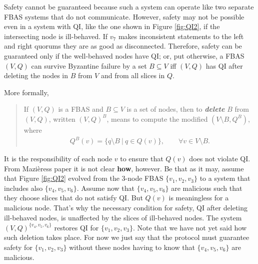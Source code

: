 Safety cannot be guaranteed because such a system can operate like two separate FBAS systems that do not communicate. However, safety may not be possible even in a system with QI, like the one shown in Figure \ref{fig:QI2}, if the intersecting node is ill-behaved. If $v_7$ makes inconsistent statements to the left and right quorums they are as good as disconnected. Therefore, safety can be guaranteed only if the well-behaved nodes have QI; or, put otherwise, a FBAS $(V, Q)$ can survive Byzantine failure by a set $B \subseteq V$ iff $(V, Q)$ has QI after deleting the nodes in $B$ from $V$ and from all slices in $Q$. 

More formally,
\begin{quote}
\vspace{-0.6cm}
\small
\begin{defin}
\label{delete}
If $(V, Q)$ is a FBAS and $B \subseteq V$ is a set of nodes, then to \emph{\textbf{delete}} $B$ from $(V, Q)$, written $(V, Q)^B$, means to compute the modified $(V \setminus B, Q^B)$, where
\begin{align}
Q^B(v) = \{ q \setminus B\ |\ q \in Q(v) \},		\qquad \forall v \in V \setminus B.
\end{align}
\end{defin}
\end{quote}
It is the responsibility of each node $v$ to ensure that $Q(v)$ does not violate QI. From Mazi\`eress paper it is not clear {\bf how}, however. Be that as it may, assume that Figure \ref{fig:QI2} evolved from the 3-node FBAS $\{ v_1, v_2, v_3 \}$ to a system that includes also $\{ v_4, v_5, v_6 \}$. Assume now that $\{ v_4, v_5, v_6 \}$ are malicious such that they choose slices that do not satisfy QI. But $Q(v)$ is meaningless for a malicious node. That's why the necessary condition for safety, QI after deleting ill-behaved nodes, is unaffected by the slices of ill-behaved nodes. The system $(V, Q)^{ \{ v_4, v_5, v_6 \} }$ restores QI for $\{ v_1, v_2, v_3 \}$. Note that we have not yet said how such deletion takes place. For now we just say that the protocol must guarantee safety for $\{ v_1, v_2, v_3 \}$ without these nodes having to know that $\{ v_4, v_5, v_6 \}$ are malicious.

